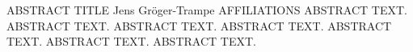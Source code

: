 \begin{conf-abstract}
{ABSTRACT TITLE}
{Jens Gröger-Trampe}
{AFFILIATIONS}
{ABSTRACT TEXT. ABSTRACT TEXT. ABSTRACT TEXT. ABSTRACT TEXT. ABSTRACT TEXT. ABSTRACT TEXT. ABSTRACT TEXT.}
\end{conf-abstract}
